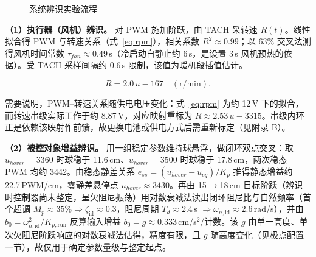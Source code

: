 \documentclass[12pt,a4paper]{ctexart}
\begin{document}
\begin{figure}[H]
\centering
{}
\caption{系统辨识实验流程}
\label{fig:idflow}
\end{figure}

\textbf{（1）执行器（风机）辨识。} 对 PWM 施加阶跃，由 TACH 采转速 $R(t)$。线性拟合得 PWM 与转速关系（式~\eqref{eq:rpm}），相关系数 $R^2\approx0.99$；以 63\% 交叉法测得风机时间常数 $\tau_{fan}\approx0.49$\,s（冷启动自静止约 6\,s，是设置 3\,s 风机预热的依据）。受 TACH 采样间隔约 0.6\,s 限制，该值为暖机段插值估计。

\begin{equation}
R = 2.0\,u - 167 \quad (\text{r/min}).
\label{eq:rpm}
\end{equation}

需要说明，PWM--转速关系随供电电压变化：式~\eqref{eq:rpm} 为约 12\,V 下的拟合，而转速串级实际工作于约 8.87\,V，对应映射重标为 $R\approx2.53\,u-3315$。串级内环正是依赖该映射作前馈，故更换电池或供电方式后需重新标定（见附录 B）。

\textbf{（2）被控对象增益辨识。} 用一组稳定参数维持球悬浮，做闭环双点交叉：取 $u_{hover}{=}3360$ 时球稳于 11.6\,cm、$u_{hover}{=}3500$ 时球稳于 17.8\,cm，两次稳态 PWM 均约 3442。由稳态静差关系 $e_{ss}=(u_{hover}-u_{eq})/K_p$ 推得静态增益约 22.7\,PWM/cm，零静差悬停点 $u_{hover}\approx3430$。再由 15$\rightarrow$18\,cm 目标阶跃（辨识时控制器尚未整定，呈欠阻尼振荡）用对数衰减法读出闭环阻尼比与自然频率（首个超调 $M_p\approx35\%\Rightarrow\zeta_{\mathrm{id}}\approx0.3$，阻尼周期 $T_d\approx2.4$\,s $\Rightarrow\omega_{n,\mathrm{id}}\approx2.6$\,rad/s），并由 $b_0=\omega_{n,\mathrm{id}}^2/K_{p,\mathrm{run}}$ 反算输入增益 $b_0=g\approx0.333$\,cm/s$^2$/计数。该 $g$ 由单一高度、单次欠阻尼阶跃响应的对数衰减法估得，精度有限，且 $g$ 随高度变化（见极点配置一节），故仅用于确定参数量级与整定起点。
\end{document}
